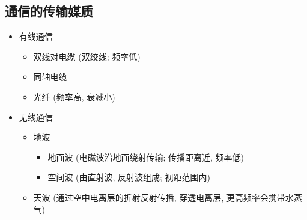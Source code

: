 \subsection{通信的传输媒质}
\begin{itemize}
    \item 有线通信
          \begin{itemize}
              \item 双线对电缆 (双绞线; 频率低)
              \item 同轴电缆
              \item 光纤 (频率高, 衰减小)
          \end{itemize}
    \item 无线通信
          \begin{itemize}
              \item 地波
                    \begin{itemize}
                        \item 地面波 (电磁波沿地面绕射传输; 传播距离近, 频率低)
                        \item 空间波 (由直射波, 反射波组成; 视距范围内)
                    \end{itemize}
              \item 天波 (通过空中电离层的折射反射传播, 穿透电离层, 更高频率会携带水蒸气)
          \end{itemize}
\end{itemize}
